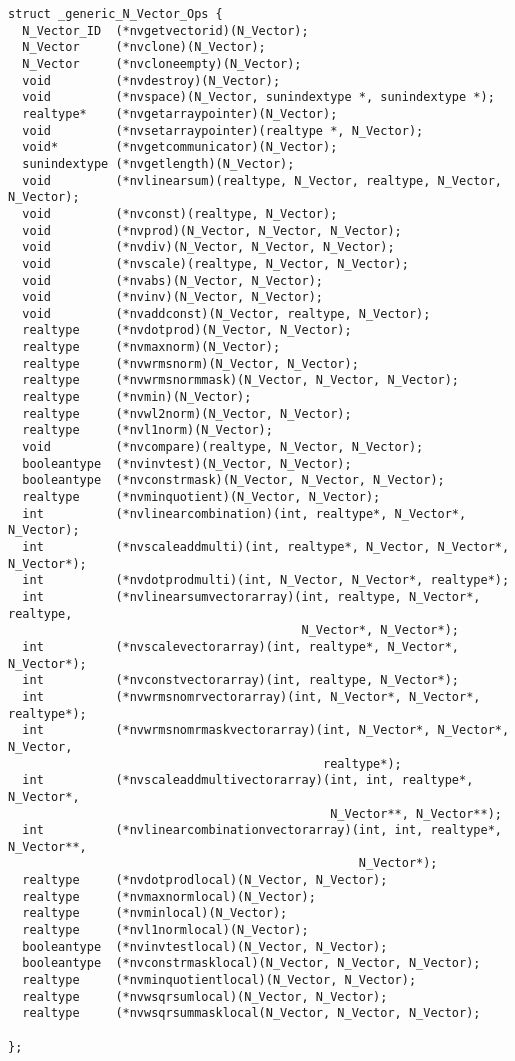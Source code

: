 \begin{verbatim}
struct _generic_N_Vector_Ops {
  N_Vector_ID  (*nvgetvectorid)(N_Vector);
  N_Vector     (*nvclone)(N_Vector);
  N_Vector     (*nvcloneempty)(N_Vector);
  void         (*nvdestroy)(N_Vector);
  void         (*nvspace)(N_Vector, sunindextype *, sunindextype *);
  realtype*    (*nvgetarraypointer)(N_Vector);
  void         (*nvsetarraypointer)(realtype *, N_Vector);
  void*        (*nvgetcommunicator)(N_Vector);
  sunindextype (*nvgetlength)(N_Vector);
  void         (*nvlinearsum)(realtype, N_Vector, realtype, N_Vector, N_Vector);
  void         (*nvconst)(realtype, N_Vector);
  void         (*nvprod)(N_Vector, N_Vector, N_Vector);
  void         (*nvdiv)(N_Vector, N_Vector, N_Vector);
  void         (*nvscale)(realtype, N_Vector, N_Vector);
  void         (*nvabs)(N_Vector, N_Vector);
  void         (*nvinv)(N_Vector, N_Vector);
  void         (*nvaddconst)(N_Vector, realtype, N_Vector);
  realtype     (*nvdotprod)(N_Vector, N_Vector);
  realtype     (*nvmaxnorm)(N_Vector);
  realtype     (*nvwrmsnorm)(N_Vector, N_Vector);
  realtype     (*nvwrmsnormmask)(N_Vector, N_Vector, N_Vector);
  realtype     (*nvmin)(N_Vector);
  realtype     (*nvwl2norm)(N_Vector, N_Vector);
  realtype     (*nvl1norm)(N_Vector);
  void         (*nvcompare)(realtype, N_Vector, N_Vector);
  booleantype  (*nvinvtest)(N_Vector, N_Vector);
  booleantype  (*nvconstrmask)(N_Vector, N_Vector, N_Vector);
  realtype     (*nvminquotient)(N_Vector, N_Vector);
  int          (*nvlinearcombination)(int, realtype*, N_Vector*, N_Vector);
  int          (*nvscaleaddmulti)(int, realtype*, N_Vector, N_Vector*, N_Vector*);
  int          (*nvdotprodmulti)(int, N_Vector, N_Vector*, realtype*);
  int          (*nvlinearsumvectorarray)(int, realtype, N_Vector*, realtype,
                                         N_Vector*, N_Vector*);
  int          (*nvscalevectorarray)(int, realtype*, N_Vector*, N_Vector*);
  int          (*nvconstvectorarray)(int, realtype, N_Vector*);
  int          (*nvwrmsnomrvectorarray)(int, N_Vector*, N_Vector*, realtype*);
  int          (*nvwrmsnomrmaskvectorarray)(int, N_Vector*, N_Vector*, N_Vector,
                                            realtype*);
  int          (*nvscaleaddmultivectorarray)(int, int, realtype*, N_Vector*,
                                             N_Vector**, N_Vector**);
  int          (*nvlinearcombinationvectorarray)(int, int, realtype*, N_Vector**,
                                                 N_Vector*);
  realtype     (*nvdotprodlocal)(N_Vector, N_Vector);
  realtype     (*nvmaxnormlocal)(N_Vector);
  realtype     (*nvminlocal)(N_Vector);
  realtype     (*nvl1normlocal)(N_Vector);
  booleantype  (*nvinvtestlocal)(N_Vector, N_Vector);
  booleantype  (*nvconstrmasklocal)(N_Vector, N_Vector, N_Vector);
  realtype     (*nvminquotientlocal)(N_Vector, N_Vector);
  realtype     (*nvwsqrsumlocal)(N_Vector, N_Vector);
  realtype     (*nvwsqrsummasklocal(N_Vector, N_Vector, N_Vector);

};
\end{verbatim}




